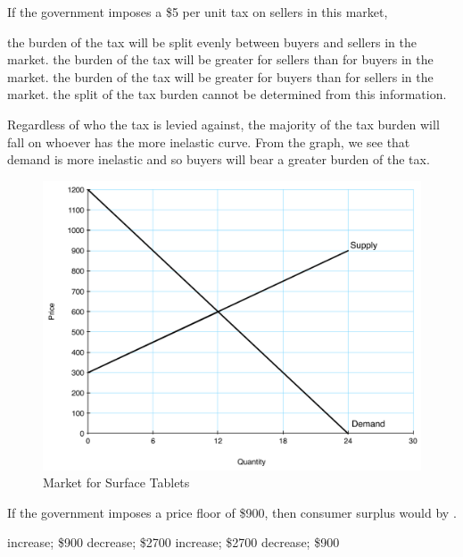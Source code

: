 \documentclass[addpoints,11pt]{exam}
\theoremstyle{definition}
\newcommand{\blank}[0]{\underline{\hspace{3cm}}}
\begin{document}
\begin{questions}
	If the government imposes a \$5 per unit tax on sellers in this market,  
	
	\begin{choices}
		\choice the burden of the tax will be split evenly between buyers and sellers in the market.
		\choice the burden of the tax will be greater for sellers than for buyers in the market.
		\CorrectChoice the burden of the tax will be greater for buyers than for sellers in the market.
		\choice the split of the tax burden cannot be determined from this information. 
	\end{choices}
	
	\begin{solution}
		Regardless of who the tax is levied against, the majority of the tax burden will fall on whoever has the more inelastic curve. From the graph, we see that demand is more inelastic and so buyers will bear a greater burden of the tax.
	\end{solution}
	


\begin{figure}[H]
	\centering
	\includegraphics[scale=.45]{hw3_plot1.pdf}
	\caption{Market for Surface Tablets}
	\label{fig2}
\end{figure}

		
	\question \label{blah1} If the government imposes a price floor of \$900, then consumer surplus would \blank by \blank.
	
	\begin{choices}
		\choice increase; \$900
		\CorrectChoice decrease; \$2700
		\choice increase; \$2700
		\choice decrease; \$900
	\end{choices}
	

\end{questions}
\end{document}
